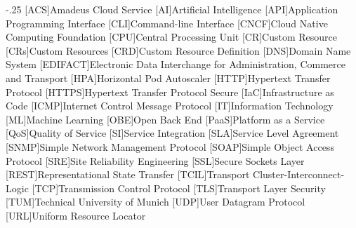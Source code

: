 \documentclass[headsepline,footsepline,footinclude=false,oneside,fontsize=11pt,paper=a4,listof=totoc,bibliography=totoc]{scrbook} %
\begin{document}


\frontmatter{}





\tableofcontents{}

\mainmatter{}

% 










\appendix{}


\begin{acronym}
	\itemsep-.25\baselineskip
	[ACS]{Amadeus Cloud Service}
	[AI]{Artificial Intelligence}
	[API]{Application Programming Interface}
	[CLI]{Command-line Interface}
	[CNCF]{Cloud Native Computing Foundation}
	[CPU]{Central Processing Unit}
	[CR]{Custom Resource}
	[CRs]{Custom Resources}
	[CRD]{Custom Resource Definition}
	[DNS]{Domain Name System}
	[EDIFACT]{Electronic Data Interchange for Administration, Commerce and Transport}
	[HPA]{Horizontal Pod Autoscaler}
	[HTTP]{Hypertext Transfer Protocol}
	[HTTPS]{Hypertext Transfer Protocol Secure}
	[IaC]{Infrastructure as Code}
	[ICMP]{Internet Control Message Protocol}
	[IT]{Information Technology}
	[ML]{Machine Learning}
	[OBE]{Open Back End}
	[PaaS]{Platform as a Service}
	[QoS]{Quality of Service}
	[SI]{Service Integration}
	[SLA]{Service Level Agreement}
	[SNMP]{Simple Network Management Protocol}
	[SOAP]{Simple Object Access Protocol}
	[SRE]{Site Reliability Engineering}
	[SSL]{Secure Sockets Layer}
	[REST]{Representational State Transfer}
	[TCIL]{Transport Cluster-Interconnect-Logic}
	[TCP]{Transmission Control Protocol}
	[TLS]{Transport Layer Security}
	[TUM]{Technical University of Munich}
	[UDP]{User Datagram Protocol}
	[URL]{Uniform Resource Locator}
\end{acronym}

\listoffigures{}
\listoftables{}
\printbibliography{}
\end{document}
